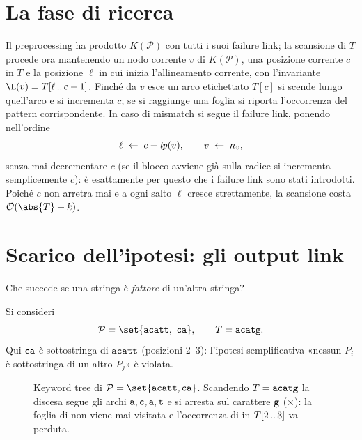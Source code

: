 \section{La fase di ricerca}
\label{sec:ricerca-ac}

Il preprocessing ha prodotto $K(\mathcal{P})$ con tutti i suoi failure link; la scansione di
$T$ procede ora mantenendo un nodo corrente $v$ di $K(\mathcal{P})$, una posizione corrente
$c$ in $T$ e la posizione $\ell$ in cui inizia l'allineamento corrente, con l'invariante
$\L(v) = \sub{T}{\ell}{c-1}$. Finché da $v$ esce un arco etichettato $T[c]$ si scende
lungo quell'arco e si incrementa $c$; se si raggiunge una foglia si riporta l'occorrenza del
pattern corrispondente. In caso di mismatch si segue il failure link, ponendo nell'ordine
\[
  \ell \;\gets\; c - \mathit{lp}(v), \qquad v \;\gets\; n_{v},
\]
senza mai decrementare $c$ (se il blocco avviene già sulla radice si incrementa
semplicemente $c$): è esattamente per questo che i failure link sono stati introdotti.
Poiché $c$ non arretra mai e a ogni salto $\ell$ cresce strettamente, la scansione costa
$\Oh(\abs{T} + k)$.

\section{Scarico dell'ipotesi: gli output link}
\label{sec:output-link}


\begin{domanda}
Che succede se una stringa è \emph{fattore} di un'altra stringa?
\end{domanda}

\begin{esempio}
Si consideri
\[
  \mathcal{P} = \set{\str{acatt},\ \str{ca}},
  \qquad
  T = \str{acatg}.
\]
Qui $\texttt{ca}$ è sottostringa di $\texttt{acatt}$ (posizioni $2$--$3$): l'ipotesi semplificativa
«nessun $P_i$ è sottostringa di un altro $P_j$» è violata.
\end{esempio}

\begin{figure}[H]
\centering

\caption{Keyword tree di $\mathcal{P} = \set{\str{acatt}, \str{ca}}$. Scandendo
$T = \texttt{acatg}$ la discesa segue gli archi $\texttt{a}, \texttt{c}, \texttt{a}, \texttt{t}$ e si
arresta sul carattere $\texttt{g}$ ($\times$): la foglia di  non viene mai visitata e
l'occorrenza di  in $T[2\,..\,3]$ va perduta.}
\label{fig:ac-output-link}
\end{figure}

